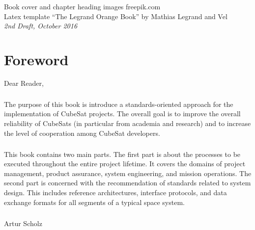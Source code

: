 \documentclass[11pt,fleqn]{book} %
\begin{document}
\noindent Book cover and chapter heading images \textcopyright freepik.com \\

\noindent Latex template ``The Legrand Orange Book'' by Mathias Legrand and Vel \\

\noindent \textit{2nd Draft, October 2016} %


\chapter*{Foreword}

Dear Reader,

\paragraph{}

The purpose of this book is introduce a standards-oriented approach for the implementation of CubeSat projects. The overall goal is to improve the overall reliability of CubeSats (in particular from academia and research) and to increase the level of cooperation among CubeSat developers.  

\paragraph{}

This book contains two main parts. The first part is about the processes to be executed throughout the entire project lifetime. It covers the domains of project management, product assurance, system engineering, and mission operations. The second part is concerned with the recommendation of standards related to system design. This includes reference architectures, interface protocols, and data exchange formats for all segments of a typical space system. 

\paragraph{}

\begin{flushright}
Artur Scholz
\end{flushright}
\end{document}
